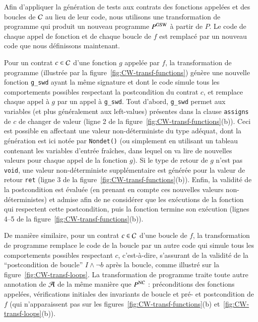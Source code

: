 Afin d'appliquer la génération de tests aux contrats des fonctions appelées et
des boucles de ${\mathcal{C}}$ au lieu de leur code, nous utilisons une transformation de
programme qui produit un nouveau programme $P^{\mathrm{GSW}}$ à partir de $P$.
Le code de chaque appel de fonction et de chaque boucle de $f$ est remplacé
par un nouveau code que nous définissons maintenant.

Pour un contrat $c\in{\ensuremath\mathcal{C}}$ d'une fonction $g$ appelée par $f$, la transformation
de programme (illustrée par la figure~\ref{fig:CW-transf-functions}) génère une
nouvelle fonction \lstinline{g_swd} ayant la même signature et dont le code
simule tous les comportements possibles respectant la postcondition du
contrat $c$, et remplace chaque appel à $g$ par un appel à \lstinline{g_swd}.
Tout d'abord, \lstinline{g_swd} permet aux variables (et plus généralement aux
left-values) présentes dans la clause \lstinline'assigns' de $c$ de changer de
valeur (ligne 2 de la figure~\ref{fig:CW-transf-functions}(b)).
Ceci est possible en affectant une valeur non-déterministe du type adéquat,
dont la génération est ici notée par \lstinline{Nondet()} (ou simplement en
utilisant un tableau contenant les variables d'entrée fraîches, dans lequel on
va lire de nouvelles valeurs pour chaque appel de la fonction $g$).
Si le type de retour de $g$ n'est pas \lstinline{void}, une valeur
non-déterministe supplémentaire est générée pour la valeur de retour
\lstinline{ret} (ligne 3 de la figure~\ref{fig:CW-transf-functions}(b)).
Enfin, la validité de la postcondition est évaluée (en prenant en compte ces
nouvelles valeurs non-déterministes) et admise afin de ne considérer que les
exécutions de la fonction qui respectent cette postcondition, puis la fonction
termine son exécution (lignes 4--5 de la
figure~\ref{fig:CW-transf-functions}(b)).

De manière similaire, pour un contrat $c\in{\ensuremath\mathcal{C}}$ d'une boucle de $f$, la
transformation de programme remplace le code de la boucle par un autre code qui
simule tous les comportements possibles respectant $c$, c'est-à-dire, s'assurant
de la validité de la ``postcondition de boucle'' $I\wedge \neg b$ après la
boucle, comme illustré sur la figure~\ref{fig:CW-transf-loops}.
La transformation de programme traite toute autre annotation de ${\mathcal{A}}$ de la
même manière que $P^{\mathrm{NC}}$ : préconditions des fonctions appelées, vérifications
initiales des invariants de boucle et pré- et postcondition de $f$ (qui
n'apparaissent pas sur les figures~\ref{fig:CW-transf-functions}(b)
et~\ref{fig:CW-transf-loops}(b)).


